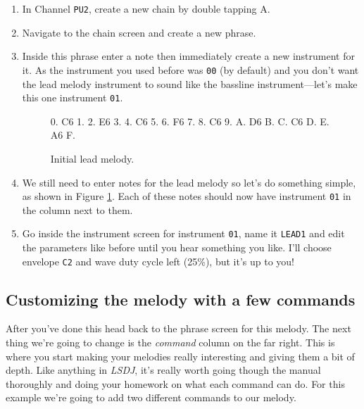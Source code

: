 \documentclass[]{article}
\newcommand{\buttonStyle}[1]{\textsf{#1}\xspace}
\newcommand{\bA}{\buttonStyle{A}}
\newcommand{\nb}[1]{\texttt{#1}\xspace}
\newcommand{\lsdj}{\textit{LSDJ}\xspace}
\begin{document}
\begin{enumerate}	

\item In Channel \nb{PU2}, create a new chain by double tapping \bA.

\item Navigate to the chain screen and create a new phrase.

\item Inside this phrase enter a note then immediately create a new instrument for it. As the instrument you used before was \nb{00} (by default) and you don't want the lead melody instrument to sound like the bassline instrument---let's make this one instrument \nb{01}.

\begin{figure}
\begin{notes}
0. C6
1.
2. E6
3.
4. C6
5.
6. F6
7.
8. C6
9.
A. D6
B.
C. C6
D.
E. A6
F.
\end{notes}
\caption{Initial lead melody.}\label{melody}%
\end{figure}

\item We still need to enter notes for the lead melody so let's do something simple, as shown in Figure \ref{melody}. Each of these notes should now have instrument \nb{01} in the column next to them.

\item Go inside the instrument screen for instrument \nb{01}, name it \nb{LEAD1} and edit the parameters like before until you hear something you like. I'll choose envelope \nb{C2} and wave duty cycle left (25\%), but it's up to you!

\end{enumerate}



\subsection{Customizing the melody with a few commands}

After you've done this head back to the phrase screen for this melody. The next thing we're going to change is the \textit{command} column on the far right. This is where you start making your melodies really interesting and giving them a bit of depth. Like anything in \lsdj, it's really worth going though the manual thoroughly and doing your homework on what each command can do. For this example we're going to add two different commands to our melody.
\end{document}
